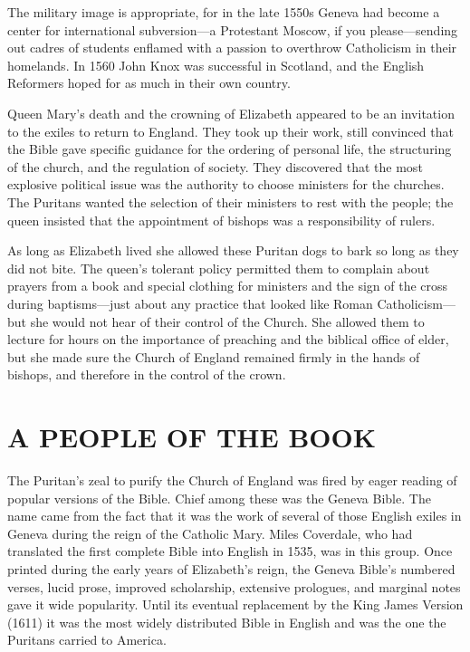 The military image is appropriate, for in the late 1550s Geneva had become a center for
international subversion—a Protestant Moscow, if you please—sending out cadres of students enflamed
with a passion to overthrow Catholicism in their homelands. In 1560 John Knox was successful in
Scotland, and the English Reformers hoped for as much in their own country.

Queen Mary’s death and the crowning of Elizabeth appeared to be an invitation to the exiles to
return to England. They took up their work, still convinced that the Bible gave specific guidance
for the ordering of personal life, the structuring of the church, and the regulation of society.
They discovered that the most explosive political issue was the authority to choose ministers for
the churches. The Puritans wanted the selection of their ministers to rest with the people; the
queen insisted that the appointment of bishops was a responsibility of rulers.

As long as Elizabeth lived she allowed these Puritan dogs to bark so long as they did not bite. The
queen’s tolerant policy permitted them to complain about prayers from a book and special clothing
for ministers and the sign of the cross during baptisms—just about any practice that looked like
Roman Catholicism—but she would not hear of their control of the Church. She allowed them to lecture
for hours on the importance of preaching and the biblical office of elder, but she made sure the
Church of England remained firmly in the hands of bishops, and therefore in the control of the
crown.

\section{A PEOPLE OF THE BOOK}

The Puritan’s zeal to purify the Church of England was fired by eager reading of popular versions of
the Bible. Chief among these was the Geneva Bible. The name came from the fact that it was the work
of several of those English exiles in Geneva during the reign of the Catholic Mary. Miles Coverdale,
who had translated the first complete Bible into English in 1535, was in this group. Once printed
during the early years of Elizabeth’s reign, the Geneva Bible’s numbered verses, lucid prose,
improved scholarship, extensive prologues, and marginal notes gave it wide popularity. Until its
eventual replacement by the King James Version (1611) it was the most widely distributed Bible in
English and was the one the Puritans carried to America.

